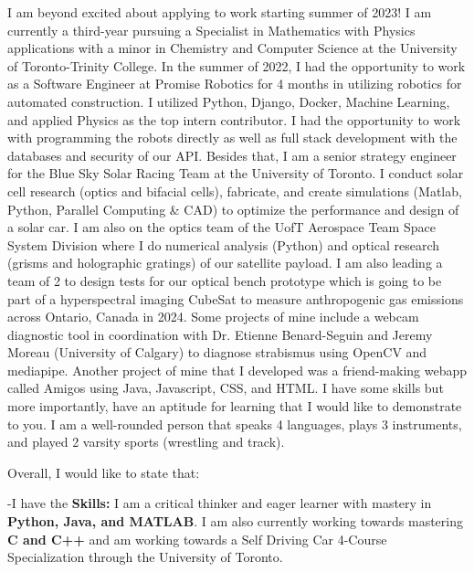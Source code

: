 \documentclass[11pt,a4]{article}
\newcommand{\bold}[1]{ {\bfseries #1}}
\begin{document}
I am beyond excited about applying to work starting summer of 2023! 
I am currently a third-year pursuing a Specialist in
 Mathematics with Physics applications with a minor 
 in Chemistry and Computer Science at the University
  of Toronto-Trinity College. In the summer of 2022,
   I had the opportunity to work as a Software Engineer
    at Promise Robotics for 4 months in utilizing robotics
     for automated construction. I utilized Python, Django,
      Docker, Machine Learning, and applied Physics as the
       top intern contributor. I had the opportunity to work
        with programming the robots directly as well as full 
        stack development with the databases and security of
         our API. Besides that, I am a senior strategy 
         engineer for the Blue Sky Solar Racing Team at 
         the University of Toronto. I conduct solar cell
          research (optics and bifacial cells), fabricate,
           and create simulations (Matlab, Python, Parallel 
           Computing & CAD) to optimize the performance and
            design of a solar car. I am also on the optics 
            team of the UofT Aerospace Team Space System
             Division where I do numerical analysis (Python) 
             and optical research (grisms and holographic 
             gratings) of our satellite payload. I am also leading a team of 2 to 
             design tests for our optical bench prototype
              which is going to be part of a hyperspectral 
              imaging CubeSat to measure anthropogenic gas 
              emissions across Ontario, Canada in 2024.
               Some projects of mine include a webcam 
               diagnostic tool in coordination with Dr.
                Etienne Benard-Seguin and Jeremy Moreau
                 (University of Calgary) to diagnose 
                 strabismus using OpenCV and mediapipe. 
                 Another project of mine that I developed
                  was a friend-making webapp called Amigos
                   using Java, Javascript, CSS, and HTML.
                    I have some skills but more importantly,
                     have an aptitude for learning that I 
                     would like to demonstrate to you. I am
                      a well-rounded person that speaks 4
                      languages, plays 3 instruments, and 
                      played 2 varsity sports (wrestling and 
                      track). \par
     Overall, I would like to state that:


-I have the \bold{Skills:} I am a critical thinker and eager learner with mastery in
\bold{Python, Java, and MATLAB}. I am also currently working towards mastering
\bold{C and C++} and am working towards a Self Driving Car 4-Course Specialization
through the University of Toronto.\par
\end{document}
